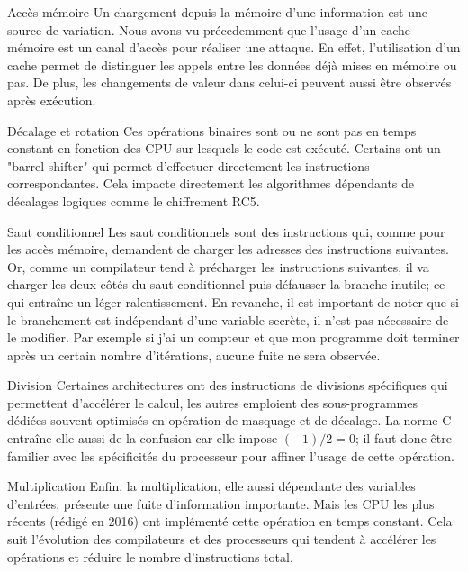 \begin{CitationBox}{Accès mémoire}
  Un chargement depuis la mémoire d'une information est une source de variation. Nous avons vu précedemment \cite{LLC_attack,DRAM_Attack} que l'usage d'un cache mémoire est un canal d'accès pour réaliser une attaque. En effet, l'utilisation d'un cache permet de distinguer les appels entre les données déjà mises en mémoire ou pas. De plus, les changements de valeur dans celui-ci peuvent aussi être observés après exécution.
\end{CitationBox}
\vspace{0.1cm}
\begin{CitationBox}{Décalage et rotation}
  Ces opérations binaires sont ou ne sont pas en temps constant en fonction des CPU sur lesquels le code est exécuté. Certains ont un "barrel shifter" qui permet d'effectuer directement les instructions correspondantes. Cela impacte directement les algorithmes dépendants de décalages logiques comme le chiffrement RC5.
\end{CitationBox}
\vspace{0.1cm}
\begin{CitationBox}{Saut conditionnel}
  Les saut conditionnels sont des instructions qui, comme pour les accès mémoire, demandent de charger les adresses des instructions suivantes. Or, comme un compilateur tend à précharger les instructions suivantes, il va charger les deux côtés du saut conditionnel puis défausser la branche inutile; ce qui entraîne un léger ralentissement. En revanche, il est important de noter que si le branchement est indépendant d'une variable secrète, il n'est pas nécessaire de le modifier. Par exemple si j'ai un compteur et que mon programme doit terminer après un certain nombre d'itérations, aucune fuite ne sera observée.
\end{CitationBox}
\vspace{0.1cm}
\begin{CitationBox}{Division}
  Certaines architectures ont des instructions de divisions spécifiques qui permettent d'accélérer le calcul, les autres emploient des sous-programmes dédiées souvent optimisés en opération de masquage et de décalage. La norme C entraîne elle aussi de la confusion car elle impose $(-1)/2 = 0$; il faut donc être familier avec les spécificités du processeur pour affiner l'usage de cette opération.
\end{CitationBox}
\vspace{0.1cm}
\begin{CitationBox}{Multiplication}
  Enfin, la multiplication, elle aussi dépendante des variables d'entrées, présente une fuite d'information importante. Mais les CPU les plus récents (rédigé en 2016) ont implémenté cette opération en temps constant. Cela suit l'évolution des compilateurs et des processeurs qui tendent à accélérer les opérations et réduire le nombre d'instructions total.
\end{CitationBox}
\vspace{0.1cm}

